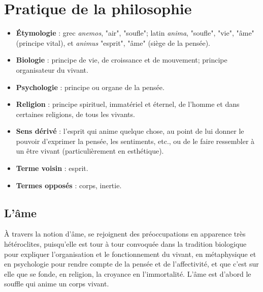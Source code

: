 
\section{Pratique de la philosophie}

\begin{itemize}[leftmargin=1cm, label=, itemsep=1pt]
\item {\bf Étymologie} : grec {\it anemos}, "air", "soufle"; latin {\it anima}, "soufle", "vie", "âme" (principe vital), et {\it animus} "esprit", "âme" (siège de la pensée).
\item {\bf Biologie} : principe de vie, de croissance et de mouvement; principe organisateur du vivant.
\item {\bf Psychologie} : principe ou organe de la pensée.
\item {\bf Religion} : principe spirituel, immatériel et éternel, de l'homme et dans certaines religions, de tous les vivants.
\item {\bf Sens dérivé} : l'esprit qui anime quelque chose, au point de lui donner le pouvoir d'exprimer la pensée, les sentiments, etc., ou de le faire ressembler à un être vivant (particulièrement en esthétique).
\item {\bf Terme voisin} : esprit.
\item {\bf Termes opposés} : corps, inertie.
\end{itemize}

\subsection{L'âme}

À travers la notion d'âme, se rejoignent des préoccupations en apparence très hétéroclites, puisqu'elle est tour à tour convoquée dans la tradition biologique pour expliquer l'organisation et le fonctionnement du vivant, en métaphysique et en psychologie pour rendre compte de la pensée et de l'affectivité, et que c'est sur elle que se fonde, en religion, la croyance en l'immortalité. L'âme est d'abord le souffle qui anime un corps vivant.


